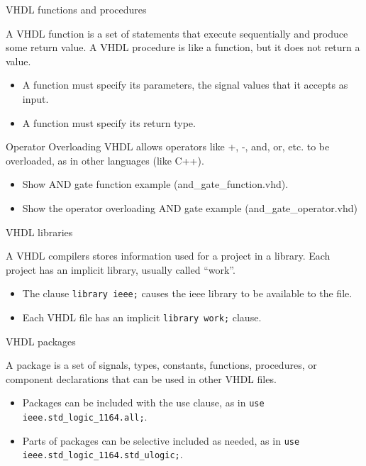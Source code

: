\begin{frame}{VHDL functions and procedures}
  \begin{definition}
    A VHDL \alert{function} is a set of statements that execute sequentially and produce some return value.  A VHDL \alert{procedure} is like a function, but it does not return a value.
  \end{definition}
  \begin{itemize}
    \item A function must specify its \alert{parameters}, the signal values that it accepts as input.
    \item A function must specify its return type.
  \end{itemize}
  \begin{block}{Operator Overloading}
    VHDL allows operators like +, -, and, or, etc. to be overloaded, as in other languages (like C++).
  \end{block}
\end{frame}

\begin{itemize}
  \item Show AND gate function example (and\_gate\_function.vhd).
  \item Show the operator overloading AND gate example (and\_gate\_operator.vhd)
\end{itemize}

\begin{frame}{VHDL libraries}
  \begin{definition}
    A VHDL compilers stores information used for a project in a \alert{library}.  Each project has an implicit library, usually called ``work''.
  \end{definition}
  \begin{itemize}
    \item The clause \texttt{library ieee;} causes the ieee library to be available to the file.
    \item Each VHDL file has an implicit \texttt{library work;} clause.
  \end{itemize}
\end{frame}

\begin{frame}{VHDL packages}
  \begin{definition}
    A \alert{package} is a set of signals, types, constants, functions, procedures, or component declarations that can be used in other VHDL files.
  \end{definition}
  \begin{itemize}
    \item Packages can be included with the use clause, as in \texttt{use ieee.std\_logic\_1164.all;}.
    \item Parts of packages can be selective included as needed, as in \texttt{use ieee.std\_logic\_1164.std\_ulogic;}.
  \end{itemize}
\end{frame}

